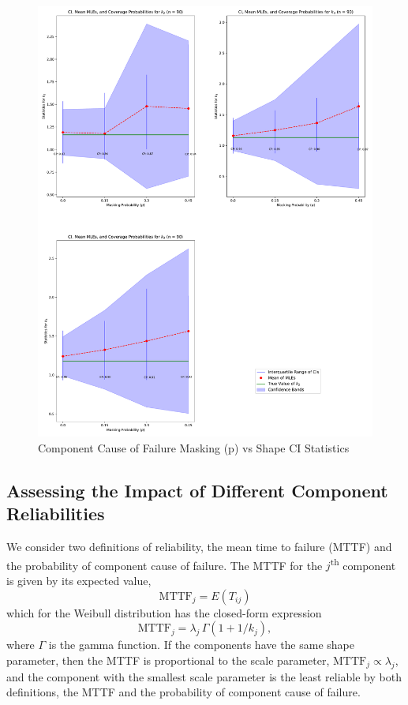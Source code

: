 \documentclass[
]{article}
\begin{document}
\begin{figure}

{\centering \includegraphics{image/plot-p-vs-stats-shapes-n90} 

}

\caption{Component Cause of Failure Masking (p) vs Shape CI Statistics}\label{fig:masking-prob-vs-stats-shape}
\end{figure}

\hypertarget{sec:mttf-c3}{%
\subsection{Assessing the Impact of Different Component
Reliabilities}\label{sec:mttf-c3}}

We consider two definitions of reliability, the mean time to failure
(MTTF) and the probability of component cause of failure. The MTTF for
the \(j\)\textsuperscript{th} component is given by its expected value,
\[
\text{MTTF}_j = E(T_{i j})
\] which for the Weibull distribution has the closed-form expression \[
\text{MTTF}_j = \lambda_j \, \Gamma(1 + 1/k_j),
\] where \(\Gamma\) is the gamma function. If the components have the
same shape parameter, then the MTTF is proportional to the scale
parameter, \(\text{MTTF}_j \propto \lambda_j\), and the component with
the smallest scale parameter is the least reliable by both definitions,
the MTTF and the probability of component cause of failure.
\end{document}
